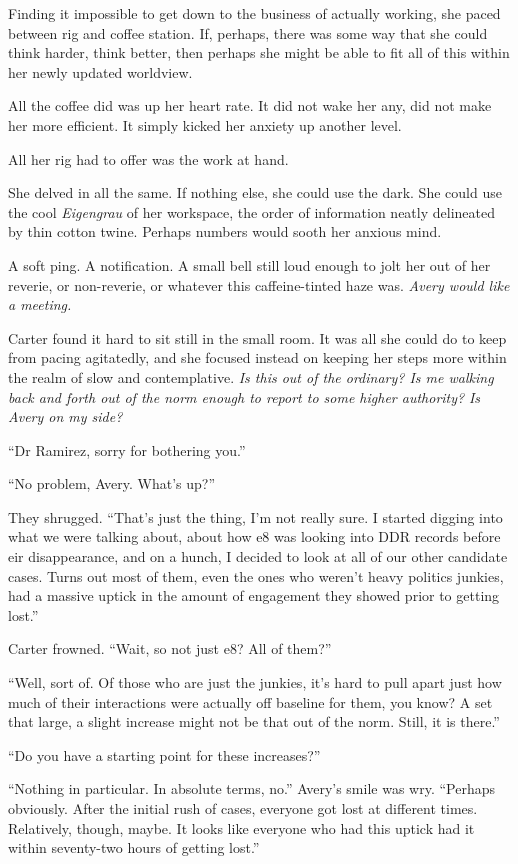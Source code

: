 Finding it impossible to get down to the business of actually working, she paced between rig and coffee station. If, perhaps, there was some way that she could think harder, think better, then perhaps she might be able to fit all of this within her newly updated worldview.

All the coffee did was up her heart rate. It did not wake her any, did not make her more efficient. It simply kicked her anxiety up another level.

All her rig had to offer was the work at hand.

She delved in all the same. If nothing else, she could use the dark. She could use the cool \emph{Eigengrau} of her workspace, the order of information neatly delineated by thin cotton twine. Perhaps numbers would sooth her anxious mind.

A soft ping. A notification. A small bell still loud enough to jolt her out of her reverie, or non-reverie, or whatever this caffeine-tinted haze was. \emph{Avery would like a meeting.}

Carter found it hard to sit still in the small room. It was all she could do to keep from pacing agitatedly, and she focused instead on keeping her steps more within the realm of slow and contemplative. \emph{Is this out of the ordinary? Is me walking back and forth out of the norm enough to report to some higher authority?} \emph{Is Avery on my side?}

``Dr Ramirez, sorry for bothering you.''

``No problem, Avery. What's up?''

They shrugged. ``That's just the thing, I'm not really sure. I started digging into what we were talking about, about how e8 was looking into DDR records before eir disappearance, and on a hunch, I decided to look at all of our other candidate cases. Turns out most of them, even the ones who weren't heavy politics junkies, had a massive uptick in the amount of engagement they showed prior to getting lost.''

Carter frowned. ``Wait, so not just e8? All of them?''

``Well, sort of. Of those who are just the junkies, it's hard to pull apart just how much of their interactions were actually off baseline for them, you know? A set that large, a slight increase might not be that out of the norm. Still, it is there.''

``Do you have a starting point for these increases?''

``Nothing in particular. In absolute terms, no.'' Avery's smile was wry. ``Perhaps obviously. After the initial rush of cases, everyone got lost at different times. Relatively, though, maybe. It looks like everyone who had this uptick had it within seventy-two hours of getting lost.''

